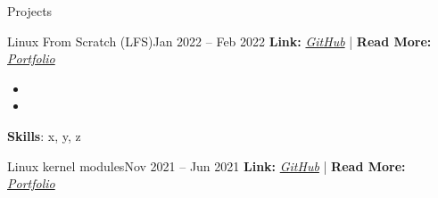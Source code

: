 \documentclass[]{Sohaib-Mohamed}
\begin{document}
\begin{cvsection}{Projects}
   \begin{cvsubsection}{Linux From Scratch (LFS)}{}{Jan 2022 -- Feb 2022}
      \textbf{Link:} \href{https://github.com/smalinux/LFS}{\textit{GitHub}} | \textbf{Read More:} \href{https://gist.github.com/smalinux/2e9c5537fdac65501a655280352c9c15#linux-from-scratch-lfs}{\textit{Portfolio}}
      \begin{itemize}
         \item
         \item
      \end{itemize}
      \textbf{Skills}: x, y, z
   \end{cvsubsection}
   \begin{cvsubsection}{Linux kernel modules}{}{Nov 2021 -- Jun 2021}
      \textbf{Link:} \href{https://github.com/smalinux/linux-kernel-modules-lab}{\textit{GitHub}} | \textbf{Read More:} \href{https://gist.github.com/smalinux/2e9c5537fdac65501a655280352c9c15#linux-kernel-modules}{\textit{Portfolio}}
      \begin{itemize}

\end{itemize}
\end{cvsubsection}
\end{cvsection}
\end{document}
